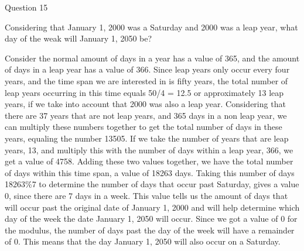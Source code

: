 \documentclass{article}
\begin{document}
\clearpage
{} Question 15
\item[] Considering that January 1, 2000 was a Saturday and 2000 was a leap year, what day of the weak will January 1, 2050 be?
\item[]Consider the normal amount of days in a year has a value of 365, and the amount of days in a leap year has a value of 366. Since leap years only occur every four years, and the time span we are interested in is fifty years, the total number of leap years occurring in this time equals 50/4 = 12.5 or approximately 13 leap years, if we take into account that 2000 was also a leap year. Considering that there are 37 years that are not leap years, and 365 days in a non leap year, we can multiply these numbers together to get the total number of days in these years, equaling the number 13505. If we take the number of years that are leap years, 13, and multiply this with the number of days within a leap year, 366, we get a value of 4758. Adding these two values together, we have the total number of days within this time span, a value of 18263 days. Taking this number of days 18263\%7 to determine the number of days that occur past Saturday, gives a value 0, since there are 7 days in a week. This value tells us the amount of days that will occur past the original date of January 1, 2000 and will help determine which day of the week the date January 1, 2050 will occur. Since we got a value of 0 for the modulus, the number of days past the day of the week will have a remainder of 0. This means that the day January 1, 2050 will also occur on a Saturday.
\end{document}

